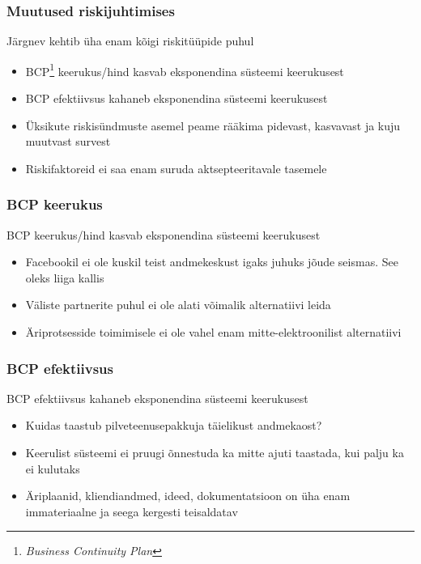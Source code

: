\begin{frame}[fragile]
  \frametitle{Muutused riskijuhtimises}
	Järgnev kehtib üha enam kõigi riskitüüpide puhul
	\begin{itemize}
		\item BCP\footnote{\emph{Business Continuity Plan}} keerukus/hind kasvab eksponendina süsteemi keerukusest
		\item BCP efektiivsus kahaneb eksponendina süsteemi keerukusest
		\item Üksikute riskisündmuste asemel peame rääkima pidevast, kasvavast ja kuju muutvast survest
		\item Riskifaktoreid ei saa enam suruda aktsepteeritavale tasemele
	\end{itemize}
\end{frame}

\iffalse
\begin{frame}[fragile]
  \frametitle{BCP keerukus}
	BCP keerukus/hind kasvab eksponendina süsteemi keerukusest
	\begin{itemize}
		\item Facebookil ei ole kuskil teist andmekeskust igaks juhuks jõude seismas. See oleks liiga kallis
		\item Väliste partnerite puhul ei ole alati võimalik alternatiivi leida
		\item Äriprotsesside toimimisele ei ole vahel enam mitte-elektroonilist alternatiivi
	\end{itemize}
\end{frame}

\begin{frame}[fragile]
  \frametitle{BCP efektiivsus}
	BCP efektiivsus kahaneb eksponendina süsteemi keerukusest
	\begin{itemize}
		\item Kuidas taastub pilveteenusepakkuja täielikust andmekaost?
		\item Keerulist süsteemi ei pruugi õnnestuda ka mitte ajuti taastada, kui palju ka ei kulutaks
		\item Äriplaanid, kliendiandmed, ideed, dokumentatsioon on üha enam immateriaalne ja seega kergesti teisaldatav
	\end{itemize}
\end{frame}

